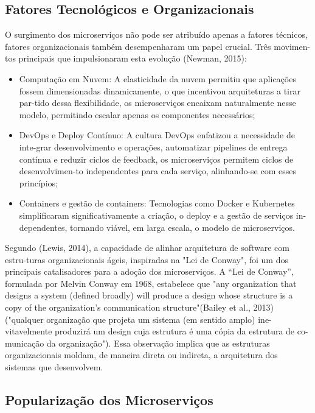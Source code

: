 \subsection{Fatores Tecnológicos e Organizacionais}

O surgimento dos microserviços não pode ser atribuído apenas a fatores técnicos, fatores organizacionais também desempenharam um papel crucial. Três movimen-tos principais que impulsionaram esta evolução (Newman, 2015):

\begin{itemize}
    \item Computação em Nuvem: A elasticidade da nuvem permitiu que aplicações fossem dimensionadas dinamicamente, o que incentivou arquiteturas a tirar par-tido dessa flexibilidade, os microserviços encaixam naturalmente nesse modelo, permitindo escalar apenas os componentes necessários;
    \item DevOps e Deploy Contínuo: A cultura DevOps enfatizou a necessidade de inte-grar desenvolvimento e operações, automatizar pipelines de entrega contínua e reduzir ciclos de feedback, os microserviços permitem ciclos de desenvolvimen-to independentes para cada serviço, alinhando-se com esses princípios;
    \item Containers e gestão de containers: Tecnologias como Docker e Kubernetes simplificaram significativamente a criação, o deploy e a gestão de serviços in-dependentes, tornando viável, em larga escala, o modelo de microserviços.
\end{itemize}

Segundo (Lewis, 2014), a capacidade de alinhar arquitetura de software com estru-turas organizacionais ágeis, inspiradas na "Lei de Conway", foi um dos principais catalisadores para a adoção dos microserviços.
A “Lei de Conway”, formulada por Melvin Conway em 1968, estabelece que "any organization that designs a system (defined broadly) will produce a design whose structure is a copy of the organization's communication structure"(Bailey et al., 2013) ("qualquer organização que projeta um sistema (em sentido amplo) ine-vitavelmente produzirá um design cuja estrutura é uma cópia da estrutura de co-municação da organização"). 
Essa observação implica que as estruturas organizacionais moldam, de maneira direta ou indireta, a arquitetura dos sistemas que desenvolvem.

\subsection{Popularização dos Microserviços}

